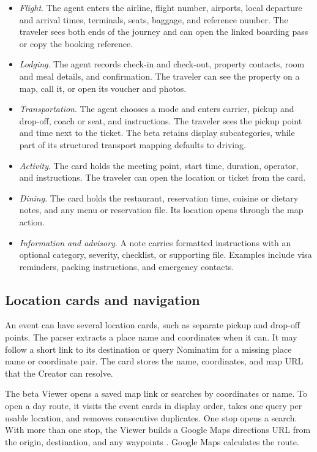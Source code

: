 \begin{itemize}
\item \emph{Flight}. The agent enters the airline, flight number, airports, local departure and arrival times, terminals, seats, baggage, and reference number. The traveler sees both ends of the journey and can open the linked boarding pass or copy the booking reference.
\item \emph{Lodging}. The agent records check-in and check-out, property contacts, room and meal details, and confirmation. The traveler can see the property on a map, call it, or open its voucher and photos.
\item \emph{Transportation}. The agent chooses a mode and enters carrier, pickup and drop-off, coach or seat, and instructions. The traveler sees the pickup point and time next to the ticket. The beta retains display subcategories, while part of its structured transport mapping defaults to driving.
\item \emph{Activity}. The card holds the meeting point, start time, duration, operator, and instructions. The traveler can open the location or ticket from the card.
\item \emph{Dining}. The card holds the restaurant, reservation time, cuisine or dietary notes, and any menu or reservation file. Its location opens through the map action.
\item \emph{Information and advisory}. A note carries formatted instructions with an optional category, severity, checklist, or supporting file. Examples include visa reminders, packing instructions, and emergency contacts.
\end{itemize}

\subsection{Location cards and navigation}
An event can have several location cards, such as separate pickup and drop-off points. The parser extracts a place name and coordinates when it can. It may follow a short link to its destination or query Nominatim for a missing place name or coordinate pair. The card stores the name, coordinates, and map URL that the Creator can resolve.

The beta Viewer opens a saved map link or searches by coordinates or name. To open a day route, it visits the event cards in display order, takes one query per usable location, and removes consecutive duplicates. One stop opens a search. With more than one stop, the Viewer builds a Google Maps directions URL from the origin, destination, and any waypoints \cite{maps}. Google Maps calculates the route.

